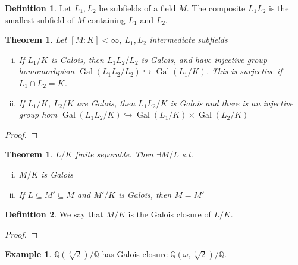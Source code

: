 \documentclass{article}
\theoremstyle{definition}
\newtheorem*{defn*}{Definition}
\newtheorem{example}[defn]{Example}
\theoremstyle{remark}
\theoremstyle{plain}
\newtheorem{thm}[defn]{Theorem}
\newcommand{\QQ}{\mathbb{Q}}
\newcommand{\Gal}{\operatorname{Gal}}
\begin{document}
\begin{defn*}
    Let $L_1,L_2$ be subfields of a field $M$. The composite $L_1L_2$ is the smallest subfield of $M$ containing $L_1$ and $L_2$.
\end{defn*}
\begin{thm}
    Let $[M:K]<\infty$, $L_1,L_2$ intermediate subfields
    \begin{enumerate}[(i)]
        \item If $L_1/K$ is Galois, then $L_1L_2/L_2$ is Galois, and have injective group homomorhpism $\Gal(L_1L_2/L_2)\hookrightarrow \Gal(L_1/K)$. This is surjective if $L_1\cap L_2=K$.
        \item If $L_1/K$, $L_2/K$ are Galois, then $L_1L_2/K$ is Galois and there is an injective group hom $\Gal(L_1L_2/K)\hookrightarrow \Gal(L_1/K)\times \Gal(L_2/K)$
    \end{enumerate}
\end{thm}
\begin{proof}
    
\end{proof}
\begin{thm}
    $L/K$ finite separable. Then $\exists M/L$ s.t. \begin{enumerate}[(i)]
        \item $M/K$ is Galois
        \item If $L\subseteq M'\subseteq M$ and $M'/K$ is Galois, then $M=M'$
    \end{enumerate}
\end{thm}
\begin{defn*}
    We say that $M/K$ is the Galois closure of $L/K$.
\end{defn*}
\begin{proof}
    
\end{proof}
\begin{example}
    $\QQ(\sqrt[3]{2})/\QQ$ has Galois closure $\QQ(\omega,\sqrt[3]{2})/\QQ$.
\end{example}
\end{document}

